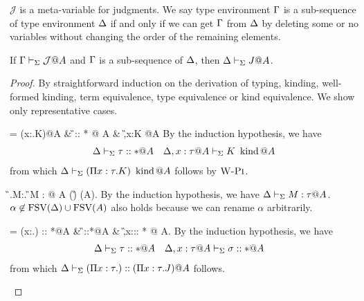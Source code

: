 

$\mathcal{J}$ is a meta-variable for judgments.
We say type environment \(\Gamma\) is a sub-sequence of type environment \(\Delta\)
if and only if we can get \(\Gamma\) from \(\Delta\) by deleting some or no variables without changing the order of the remaining elements.
\begin{lemma}[Weakening]
    \label{lemma:Weakening}
    If \(\Gamma \vdash_\Sigma \mathcal{J}@A\) and \(\Gamma\) is a sub-sequence of \(\Delta\), then \(\Delta \vdash_\Sigma J@A\).
\end{lemma}

\begin{proof}
    By straightforward induction on the derivation of typing, kinding, well-formed kinding,
    term equivalence, type equivalence or kind equivalence.
    We show only representative cases.

    \begin{rneqncase}{\WPi{}}{
             = (\Pi x:\tau.K)\iskind @A &
            \G \V \tau :: * @ A & \G,x:\tau@A \V K \iskind @A
            }
            By the induction hypothesis, we have
            \begin{align*}
                & \D \V \tau::*@A & \D, x:\tau@A \V K \iskind @ A
            \end{align*}
            from which $\Delta\vdash_\Sigma (\Pi x:\tau.K) \operatorname{\ kind} @ A$ follows by $\textsc{W-Pi}$.
    \end{rneqncase}

    \begin{rneqncase}{
            \TGen{}}{
            \G\V\Lambda\alpha.M:\forall\alpha.\tau@A {}
            \G \V M : \tau @ A  \alpha \not\in \FTV(\G) \cup \FTV(A).
        }
            By the induction hypothesis, we have \( \Delta \vdash_\Sigma M : \tau @ A \).
            \( \alpha \not\in \text{FSV}(\Delta) \cup \text{FSV}(A) \) also holds because we can rename \( \alpha \) arbitrarily.
    \end{rneqncase}

    \begin{rneqncase}{\KPi{}}{
             = (\Pi x:\tau.\sigma) :: *@A &
            \G \V \tau::*@A & \G,x:\tau@A\V \sigma :: * @ A.
            }
            By the induction hypothesis, we have
            \begin{align*}
                & \D \V \tau::*@A &  & \D,x:\tau@A\V \sigma :: * @ A
            \end{align*}
            from which $\Delta \vdash_\Sigma (\Pi x:\tau.) :: (\Pi x:\tau.J)@A$ follows.
    \end{rneqncase}


\end{proof}

